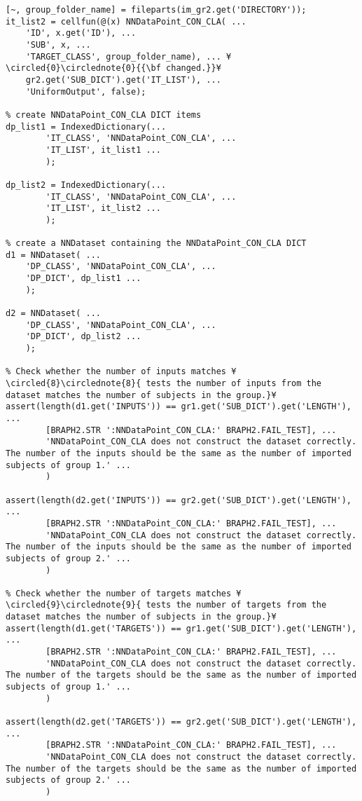 \documentclass{tufte-handout}
\begin{document}
\begin{lstlisting}
[~, group_folder_name] = fileparts(im_gr2.get('DIRECTORY'));
it_list2 = cellfun(@(x) NNDataPoint_CON_CLA( ...
    'ID', x.get('ID'), ...
    'SUB', x, ...
    'TARGET_CLASS', group_folder_name), ... ¥\circled{0}\circlednote{0}{{\bf changed.}}¥
    gr2.get('SUB_DICT').get('IT_LIST'), ...
    'UniformOutput', false);

% create NNDataPoint_CON_CLA DICT items
dp_list1 = IndexedDictionary(...
        'IT_CLASS', 'NNDataPoint_CON_CLA', ...
        'IT_LIST', it_list1 ...
        );

dp_list2 = IndexedDictionary(...
        'IT_CLASS', 'NNDataPoint_CON_CLA', ...
        'IT_LIST', it_list2 ...
        );

% create a NNDataset containing the NNDataPoint_CON_CLA DICT
d1 = NNDataset( ...
    'DP_CLASS', 'NNDataPoint_CON_CLA', ...
    'DP_DICT', dp_list1 ...
    );

d2 = NNDataset( ...
    'DP_CLASS', 'NNDataPoint_CON_CLA', ...
    'DP_DICT', dp_list2 ...
    );

% Check whether the number of inputs matches ¥\circled{8}\circlednote{8}{ tests the number of inputs from the dataset matches the number of subjects in the group.}¥
assert(length(d1.get('INPUTS')) == gr1.get('SUB_DICT').get('LENGTH'), ...
		[BRAPH2.STR ':NNDataPoint_CON_CLA:' BRAPH2.FAIL_TEST], ...
		'NNDataPoint_CON_CLA does not construct the dataset correctly. The number of the inputs should be the same as the number of imported subjects of group 1.' ...
		)

assert(length(d2.get('INPUTS')) == gr2.get('SUB_DICT').get('LENGTH'), ...
		[BRAPH2.STR ':NNDataPoint_CON_CLA:' BRAPH2.FAIL_TEST], ...
		'NNDataPoint_CON_CLA does not construct the dataset correctly. The number of the inputs should be the same as the number of imported subjects of group 2.' ...
		)

% Check whether the number of targets matches ¥\circled{9}\circlednote{9}{ tests the number of targets from the dataset matches the number of subjects in the group.}¥
assert(length(d1.get('TARGETS')) == gr1.get('SUB_DICT').get('LENGTH'), ...
		[BRAPH2.STR ':NNDataPoint_CON_CLA:' BRAPH2.FAIL_TEST], ...
		'NNDataPoint_CON_CLA does not construct the dataset correctly. The number of the targets should be the same as the number of imported subjects of group 1.' ...
		)

assert(length(d2.get('TARGETS')) == gr2.get('SUB_DICT').get('LENGTH'), ...
		[BRAPH2.STR ':NNDataPoint_CON_CLA:' BRAPH2.FAIL_TEST], ...
		'NNDataPoint_CON_CLA does not construct the dataset correctly. The number of the targets should be the same as the number of imported subjects of group 2.' ...
		)


\end{lstlisting}
\end{document}
